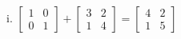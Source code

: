 \\
i. $\begin{bmatrix}1 & 0 \\ 0 & 1 \end{bmatrix}+\begin{bmatrix}3 & 2 \\ 1 & 4\end{bmatrix} =  \begin{bmatrix}4 & 2 \\1 & 5\end{bmatrix}$
\\
